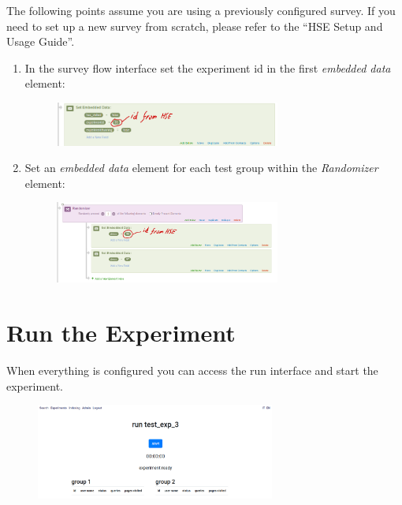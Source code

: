 \documentclass[fleqn]{article}
\begin{document}
The following points assume you are using a previously configured survey. If you need to set up a new survey from scratch,
please refer to the ``HSE Setup and Usage Guide''.

\begin{enumerate}

    \item In the survey flow interface set the experiment id in the first \emph{embedded data} element:       
        
        \begin{figure}[h!]
        \centering
        \includegraphics[width=0.7\textwidth]{img/qflow1}
        \end{figure}

    \item Set an \emph{embedded data} element for each test group within the \emph{Randomizer} element:

        \begin{figure}[h!]
        \centering
        \includegraphics[width=0.7\textwidth]{img/qflow4}
        \end{figure}

\end{enumerate}

\section{Run the Experiment}

When everything is configured you can access the run interface and start the experiment.

\begin{figure}[h!]
\centering
\includegraphics[width=0.7\textwidth]{img/expRun1}
\end{figure}
\end{document}
